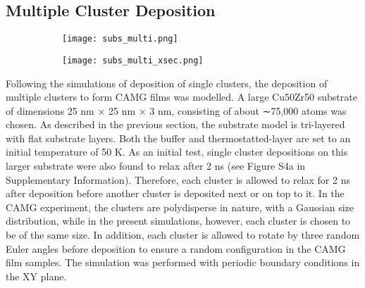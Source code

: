 \subsection{Multiple Cluster Deposition}

\begin{selfcite}
	\begin{figure}[!ht]
	\begin{subfigure}{\textwidth}
		\texttt{[image: subs\_multi.png]}
	\end{subfigure}%
	\vfill
	\begin{subfigure}{\textwidth}
		\texttt{[image: subs\_multi\_xsec.png]}
	\end{subfigure}
	\label{f:cibdmmod}
	\end{figure}

Following the simulations of deposition of single clusters, the deposition of multiple clusters to form CAMG films was modelled. A large Cu50Zr50 substrate of dimensions 25 nm × 25 nm × 3 nm, consisting of about ∼75,000 atoms was chosen. As described in the previous section, the substrate model is tri-layered with flat substrate layers. Both the buffer and thermostatted-layer are set to an initial temperature of 50 K. As an initial test, single cluster depositions on this larger substrate were also found to relax after 2 ns (see Figure S4a in Supplementary Information). Therefore, each cluster is allowed to relax for 2 ns after deposition before another cluster is deposited next or on top to it. In the CAMG experiment, the clusters are polydisperse in nature, with a Gaussian size distribution, while in the present simulations, however, each cluster is chosen to be of the same size. In addition, each cluster is allowed to rotate by three random Euler angles before deposition to ensure a random configuration in the CAMG film samples. The simulation was performed with periodic boundary conditions in the XY plane. \par
\end{selfcite}

